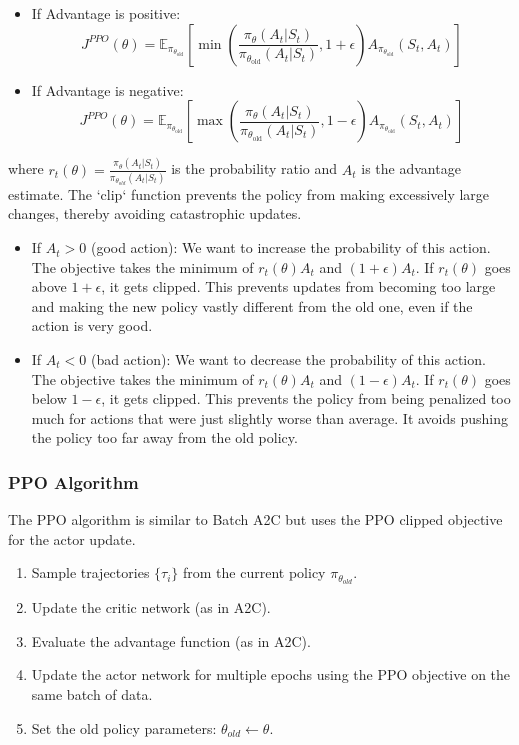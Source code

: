 \documentclass[12pt]{article}
\begin{document}
\begin{itemize}
    \item If Advantage is positive:
    \[
        J^{PPO}(\theta) = \mathbb{E}_{\pi_{\theta_{\text{old}}}}
        \left[
            \min\left(
                \frac{\pi_\theta(A_t|S_t)}{\pi_{\theta_{\text{old}}}(A_t|S_t)},
                1 + \epsilon
            \right)
            A_{\pi_{\theta_{\text{old}}}}(S_t, A_t)
        \right]
    \]
    
    \item If Advantage is negative:
    \[
        J^{PPO}(\theta) = \mathbb{E}_{\pi_{\theta_{\text{old}}}}
        \left[
            \max\left(
                \frac{\pi_\theta(A_t|S_t)}{\pi_{\theta_{\text{old}}}(A_t|S_t)},
                1 - \epsilon
            \right)
            A_{\pi_{\theta_{\text{old}}}}(S_t, A_t)
        \right]
    \]
\end{itemize}


where $r_t(\theta) = \frac{\pi_\theta(A_t|S_t)}{\pi_{\theta_{old}}(A_t|S_t)}$ is the probability ratio and $\hat{A}_t$ is the advantage estimate. The `clip` function prevents the policy from making excessively large changes, thereby avoiding catastrophic updates.

\begin{itemize}
    \item If $A_t > 0$ (good action): We want to increase the probability of this action. The objective takes the minimum of $r_t(\theta)A_t$ and $(1+\epsilon)A_t$. If $r_t(\theta)$ goes above $1+\epsilon$, it gets clipped. This prevents updates from becoming too large and making the new policy vastly different from the old one, even if the action is very good.
    \item If $A_t < 0$ (bad action): We want to decrease the probability of this action. The objective takes the minimum of $r_t(\theta)A_t$ and $(1-\epsilon)A_t$. If $r_t(\theta)$ goes below $1-\epsilon$, it gets clipped. This prevents the policy from being penalized too much for actions that were just slightly worse than average. It avoids pushing the policy too far away from the old policy.
\end{itemize}

\subsubsection{PPO Algorithm}
The PPO algorithm is similar to Batch A2C but uses the PPO clipped objective for the actor update.
\begin{enumerate}
    \item Sample trajectories $\{\tau_i\}$ from the current policy $\pi_{\theta_{old}}$.
    \item Update the critic network (as in A2C).
    \item Evaluate the advantage function (as in A2C).
    \item Update the actor network for multiple epochs using the PPO objective on the same batch of data.
    \item Set the old policy parameters: $\theta_{old} \leftarrow \theta$.
\end{enumerate}
\end{document}
